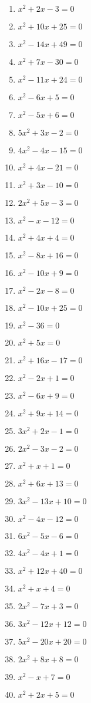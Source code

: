\documentclass[12pt]{report}
\newcommand{\1}{\faThermometerEmpty}
\newcommand{\2}{\faThermometerQuarter}
\newcommand{\3}{\faThermometerHalf}
\newcommand{\4}{\faThermometerThreeQuarters}
\newcommand{\5}{\faThermometerFull}
\begin{document}
\begin{enumerate}
\begin{multicols}{2}
\begin{enumerate}[label=\arabic*.]
    \item $x^2 + 2x - 3 = 0$
    \item $x^2 + 10x + 25 = 0$
    \item $x^2 - 14x + 49 = 0$
    \item $x^2 + 7x - 30 = 0$
    \item $x^2 - 11x + 24 = 0$
    \item $x^2 - 6x + 5 = 0$
    \item $x^2 - 5x + 6 = 0$
    \item $5x^2 + 3x - 2 = 0$
    \item $4x^2 - 4x - 15 = 0$
    \item $x^2 + 4x - 21 = 0$
    \item $x^2 + 3x - 10 = 0$
    \item $2x^2 + 5x - 3 = 0$
    \item $x^2 - x - 12 = 0$
    \item $x^2 + 4x + 4 = 0$
    \item $x^2 - 8x + 16 = 0$
    \item $x^2 - 10x + 9 = 0$
    \item $x^2 - 2x - 8 = 0$
    \item $x^2 - 10x + 25 = 0$
    \item $x^2 - 36 = 0$
    \item $x^2 + 5x = 0$
    \item $x^2 + 16x - 17 = 0$
    \item $x^2 - 2x + 1 = 0$
    \item $x^2 - 6x + 9 = 0$
    \item $x^2 + 9x + 14 = 0$
    \item $3x^2 + 2x - 1 = 0$
    \item $2x^2 - 3x - 2 = 0$
    \item $x^2 + x + 1 = 0$
    \item $x^2 + 6x + 13 = 0$
    \item $3x^2 - 13x + 10 = 0$
    \item $x^2 - 4x - 12 = 0$
    \item $6x^2 - 5x - 6 = 0$
    \item $4x^2 - 4x + 1 = 0$
    \item $x^2 + 12x + 40 = 0$
    \item $x^2 + x + 4 = 0$
    \item $2x^2 - 7x + 3 = 0$
    \item $3x^2 - 12x + 12 = 0$
    \item $5x^2 - 20x + 20 = 0$
    \item $2x^2 + 8x + 8 = 0$
    \item $x^2 - x + 7 = 0$
    \item $x^2 + 2x + 5 = 0$
    \end{enumerate}
\end{multicols}


\end{enumerate}
\end{document}
